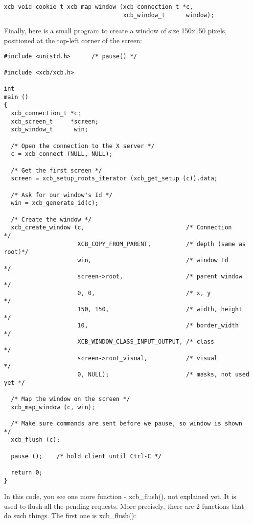 \documentclass[12pt,oneside,titlepage]{book}
\begin{document}
\begin{enumerate}
\begin{verbatim}
xcb_void_cookie_t xcb_map_window (xcb_connection_t *c,
                                  xcb_window_t      window);
\end{verbatim}

  Finally, here is a small program to create a window of size 150x150
  pixels, positioned at the top-left corner of the screen:

\begin{verbatim}
#include <unistd.h>      /* pause() */

#include <xcb/xcb.h>

int
main ()
{
  xcb_connection_t *c;
  xcb_screen_t     *screen;
  xcb_window_t      win;

  /* Open the connection to the X server */
  c = xcb_connect (NULL, NULL);

  /* Get the first screen */
  screen = xcb_setup_roots_iterator (xcb_get_setup (c)).data;

  /* Ask for our window's Id */
  win = xcb_generate_id(c);

  /* Create the window */
  xcb_create_window (c,                             /* Connection          */
                     XCB_COPY_FROM_PARENT,          /* depth (same as root)*/
                     win,                           /* window Id           */
                     screen->root,                  /* parent window       */
                     0, 0,                          /* x, y                */
                     150, 150,                      /* width, height       */
                     10,                            /* border_width        */
                     XCB_WINDOW_CLASS_INPUT_OUTPUT, /* class               */
                     screen->root_visual,           /* visual              */
                     0, NULL);                      /* masks, not used yet */

  /* Map the window on the screen */
  xcb_map_window (c, win);

  /* Make sure commands are sent before we pause, so window is shown */
  xcb_flush (c);

  pause ();    /* hold client until Ctrl-C */

  return 0;
}
\end{verbatim}

  In this code, you see one more function - {xcb\_flush()}, not
  explained yet. It is used to flush all the pending requests. More
  precisely, there are 2 functions that do such things. The first one is
  {xcb\_flush()}:


\end{enumerate}
\end{document}
